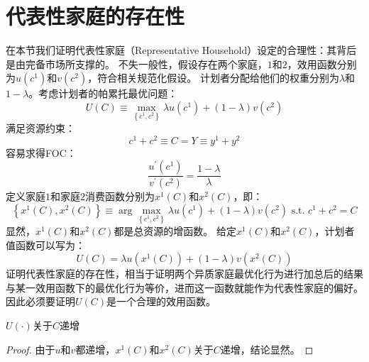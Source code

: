
\section{代表性家庭的存在性}    \label{sec-ra-existence}

在本节我们证明代表性家庭（Representative Household）设定的合理性：其背后是由完备市场所支撑的。
不失一般性，假设存在两个家庭，$1$和$2$，效用函数分别为$u\left(c^1\right)$和$v\left(c^2\right)$，符合相关规范化假设。
计划者分配给他们的权重分别为$\lambda$和$1-\lambda$。考虑计划者的帕累托最优问题：
\begin{equation}
    U(C) \equiv \max _{\left\{c^1, c^2\right\}} \lambda u\left(c^1\right)+(1-\lambda) v\left(c^2\right)
\end{equation}
满足资源约束：
\begin{equation}
    c^1+c^2 \equiv C = Y \equiv y^1 + y^2
\end{equation}
容易求得FOC：
\begin{equation}
    \frac{u^{\prime}\left(c^1\right)}{v^{\prime}\left(c^2\right)} = \frac{1-\lambda}{\lambda}
\end{equation}
定义家庭$1$和家庭$2$消费函数分别为$x^1\left(C\right)$和$x^2\left(C\right)$，即：
\begin{equation*}
    \left\{x^1(C), x^2(C)\right\} 
        \equiv \arg\max_{\left\{c^1, c^2\right\}} \lambda u\left(c^1\right)+(1-\lambda) v\left(c^2\right) \text { s.t. } c^1+c^2=C
\end{equation*}
显然，$x^1\left(C\right)$和$x^2\left(C\right)$都是总资源的增函数。
给定$x^1\left(C\right)$和$x^2\left(C\right)$，计划者值函数可以写为：
\begin{equation}    \label{eq-u-h1h2}
    U\left(C\right)=\lambda u\left(x^1\left(C\right)\right)+\left(1-\lambda\right) v\left(x^2\left(C\right)\right)
\end{equation}
证明代表性家庭的存在性，相当于证明两个异质家庭最优化行为进行加总后的结果与某一效用函数下的最优化行为等价，进而这一函数就能作为代表性家庭的偏好。
因此必须要证明$U\left(C\right)$是一个合理的效用函数。
\begin{property}
    $U\left(\cdot\right)$关于$C$递增
\end{property}
\begin{proof}
    由于$u$和$v$都递增，$x^1\left(C\right)$和$x^2\left(C\right)$关于$C$递增，结论显然。
\end{proof}


